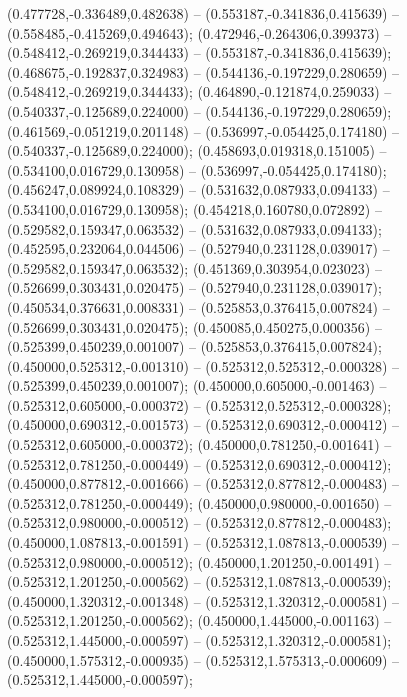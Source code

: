 (0.477728,-0.336489,0.482638) -- (0.553187,-0.341836,0.415639) -- (0.558485,-0.415269,0.494643);
 (0.472946,-0.264306,0.399373) -- (0.548412,-0.269219,0.344433) -- (0.553187,-0.341836,0.415639);
 (0.468675,-0.192837,0.324983) -- (0.544136,-0.197229,0.280659) -- (0.548412,-0.269219,0.344433);
 (0.464890,-0.121874,0.259033) -- (0.540337,-0.125689,0.224000) -- (0.544136,-0.197229,0.280659);
 (0.461569,-0.051219,0.201148) -- (0.536997,-0.054425,0.174180) -- (0.540337,-0.125689,0.224000);
 (0.458693,0.019318,0.151005) -- (0.534100,0.016729,0.130958) -- (0.536997,-0.054425,0.174180);
 (0.456247,0.089924,0.108329) -- (0.531632,0.087933,0.094133) -- (0.534100,0.016729,0.130958);
 (0.454218,0.160780,0.072892) -- (0.529582,0.159347,0.063532) -- (0.531632,0.087933,0.094133);
 (0.452595,0.232064,0.044506) -- (0.527940,0.231128,0.039017) -- (0.529582,0.159347,0.063532);
 (0.451369,0.303954,0.023023) -- (0.526699,0.303431,0.020475) -- (0.527940,0.231128,0.039017);
 (0.450534,0.376631,0.008331) -- (0.525853,0.376415,0.007824) -- (0.526699,0.303431,0.020475);
 (0.450085,0.450275,0.000356) -- (0.525399,0.450239,0.001007) -- (0.525853,0.376415,0.007824);
 (0.450000,0.525312,-0.001310) -- (0.525312,0.525312,-0.000328) -- (0.525399,0.450239,0.001007);
 (0.450000,0.605000,-0.001463) -- (0.525312,0.605000,-0.000372) -- (0.525312,0.525312,-0.000328);
 (0.450000,0.690312,-0.001573) -- (0.525312,0.690312,-0.000412) -- (0.525312,0.605000,-0.000372);
 (0.450000,0.781250,-0.001641) -- (0.525312,0.781250,-0.000449) -- (0.525312,0.690312,-0.000412);
 (0.450000,0.877812,-0.001666) -- (0.525312,0.877812,-0.000483) -- (0.525312,0.781250,-0.000449);
 (0.450000,0.980000,-0.001650) -- (0.525312,0.980000,-0.000512) -- (0.525312,0.877812,-0.000483);
 (0.450000,1.087813,-0.001591) -- (0.525312,1.087813,-0.000539) -- (0.525312,0.980000,-0.000512);
 (0.450000,1.201250,-0.001491) -- (0.525312,1.201250,-0.000562) -- (0.525312,1.087813,-0.000539);
 (0.450000,1.320312,-0.001348) -- (0.525312,1.320312,-0.000581) -- (0.525312,1.201250,-0.000562);
 (0.450000,1.445000,-0.001163) -- (0.525312,1.445000,-0.000597) -- (0.525312,1.320312,-0.000581);
 (0.450000,1.575312,-0.000935) -- (0.525312,1.575313,-0.000609) -- (0.525312,1.445000,-0.000597);
